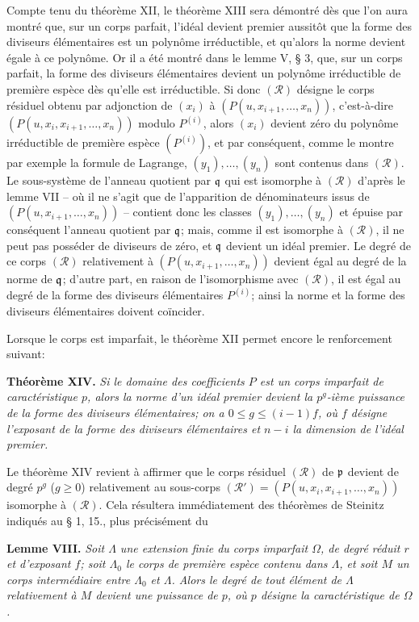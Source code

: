 Compte tenu du théorème XII, le théorème XIII sera démontré dès que l'on aura montré que, sur un corps parfait, l'idéal devient premier aussitôt que la forme des diviseurs élémentaires est un polynôme irréductible, et qu'alors la norme devient égale à ce polynôme. Or il a été montré dans le lemme V, \S{} 3, que, sur un corps parfait, la forme des diviseurs élémentaires devient un polynôme irréductible de première espèce dès qu'elle est irréductible. Si donc $(\mathcal R)$ désigne le corps résiduel obtenu par adjonction de $(x_i)$ à $(P(u,x_{i+1},\ldots,x_n))$, c'est-à-dire $(P(u,x_i,x_{i+1},\ldots,x_n))$ modulo $P^{(i)}$, alors $(x_i)$ devient zéro du polynôme irréductible de première espèce $(P^{(i)})$, et par conséquent, comme le montre par exemple la formule de Lagrange, $(y_1),\ldots,(y_n)$ sont contenus dans $(\mathcal R)$. Le sous-système de l'anneau quotient par $\mathfrak q$ qui est isomorphe à $(\mathcal R)$ d'après le lemme VII -- où il ne s'agit que de l'apparition de dénominateurs issus de $(P(u,x_{i+1},\ldots,x_n))$ -- contient donc les classes $(y_1),\ldots,(y_n)$ et épuise par conséquent l'anneau quotient par $\mathfrak q$; mais, comme il est isomorphe à $(\mathcal R)$, il ne peut pas posséder de diviseurs de zéro, et $\mathfrak q$ devient un idéal premier. Le degré de ce corps $(\mathcal R)$ relativement à $(P(u,x_{i+1},\ldots,x_n))$ devient égal au degré de la norme de $\mathfrak q$; d'autre part, en raison de l'isomorphisme avec $(\mathcal R)$, il est égal au degré de la forme des diviseurs élémentaires $P^{(i)}$; ainsi la norme et la forme des diviseurs élémentaires doivent coïncider.

Lorsque le corps est imparfait, le théorème XII permet encore le renforcement suivant:

\textbf{Théorème XIV.} \emph{Si le domaine des coefficients $P$ est un corps imparfait de caractéristique $p$, alors la norme d'un idéal premier devient la $p^g$-ième puissance de la forme des diviseurs élémentaires; on a $0\le g\le(i-1)f$, où $f$ désigne l'exposant de la forme des diviseurs élémentaires et $n-i$ la dimension de l'idéal premier.}

Le théorème XIV revient à affirmer que le corps résiduel $(\mathcal R)$ de $\mathfrak p$ devient de degré $p^g$ ($g\ge0$) relativement au sous-corps $(\mathcal R')=(P(u,x_i,x_{i+1},\ldots,x_n))$ isomorphe à $(\mathcal R)$. Cela résultera immédiatement des théorèmes de Steinitz indiqués au \S{} 1, 15., plus précisément du

\textbf{Lemme VIII.} \emph{Soit $\Lambda$ une extension finie du corps imparfait $\Omega$, de degré réduit $r$ et d'exposant $f$; soit $\Lambda_0$ le corps de première espèce contenu dans $\Lambda$, et soit $M$ un corps intermédiaire entre $\Lambda_0$ et $\Lambda$. Alors le degré de tout élément de $\Lambda$ relativement à $M$ devient une puissance de $p$, où $p$ désigne la caractéristique de $\Omega$.}

